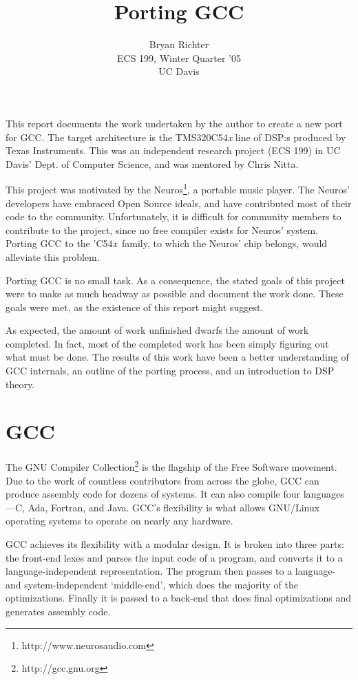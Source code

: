 \documentclass{article}
\author{Bryan Richter\\ECS 199, Winter Quarter '05\\UC Davis}
\title{Porting GCC}
\newcommand{\chip}{'C54\emph{x}}
\begin{document}
\maketitle

This report documents the work undertaken by the author to create a new port for
GCC. The target architecture is the TMS320C54\emph{x} line of DSP:s produced by Texas
Instruments. This was an independent research project (ECS 199) in UC Davis'
Dept. of Computer Science, and was mentored by Chris Nitta. 

This project was motivated by the Neuros\footnote{http://www.neurosaudio.com}, a
portable music player. The Neuros' developers have embraced Open Source ideals,
and have contributed most of their code to the community. Unfortunately, it is
difficult for community members to contribute to the project, since no free
compiler exists for Neuros' system. Porting GCC to the \chip\ family, to which
the Neuros' chip belongs, would alleviate this problem.

Porting GCC is no small task. As a consequence, the stated goals of this project
were to make as much headway as possible and document the work done. These goals
were met, as the existence of this report might suggest.

As expected, the amount of work unfinished dwarfs the amount of work completed.
In fact, most of the completed work has been simply figuring out what must be
done. The results of this work have been a better understanding of GCC
internals, an outline of the porting process, and an introduction to DSP
theory.

\section{GCC}
The GNU Compiler Collection\footnote{http://gcc.gnu.org} is the flagship of the
Free Software movement. Due to the work of countless contributors from across
the globe, GCC can produce assembly code for dozens of systems. It can also
compile four languages---C, Ada, Fortran, and Java. GCC's flexibility is what
allows GNU/Linux operating systems to operate on nearly any hardware. 

GCC achieves its flexibility with a modular design. It is broken into three
parts: the front-end lexes and parses the input code of a program, and converts
it to a language-independent representation. The program then passes to a
language- and system-independent `middle-end', which does the majority of the
optimizations. Finally it is passed to a back-end that does final optimizations
and generates assembly code.
\end{document}
